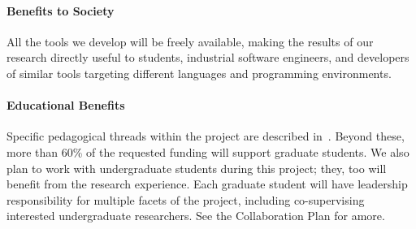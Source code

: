 \paragraph*{Benefits to Society} 
%
All the tools we develop will be freely available, making the results
of our research directly useful to students, industrial software
engineers, and developers of similar tools targeting different
languages and programming environments.

\paragraph*{Educational Benefits}
Specific pedagogical threads within the project are described
in~.  Beyond these, more than
60\%\iflater{}\fi{} of the requested funding will support
graduate students.  We also plan to work with undergraduate students
during this project; they, too will benefit from the research
experience. Each graduate student will have leadership responsibility
for multiple facets of the project, including co-supervising
interested undergraduate researchers.  See the Collaboration Plan for
amore. 


